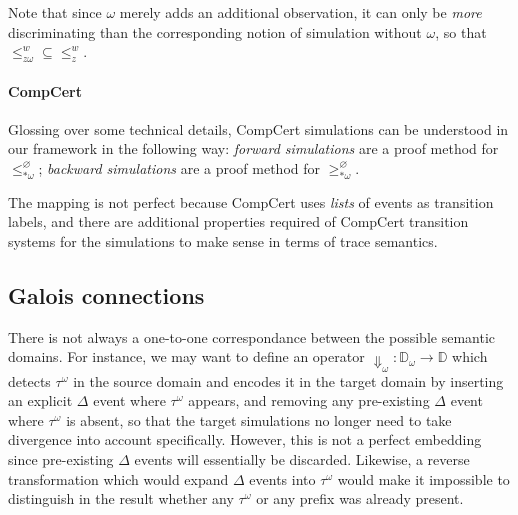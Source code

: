 \documentclass[11pt]{article}
\begin{document}
Note that since $\omega$ merely adds an additional observation,
it can only be \emph{more} discriminating than
the corresponding notion of simulation without $\omega$,
so that ${\le^w_{z \omega}} \subseteq {\le^w_z}$.


\paragraph{CompCert} %

Glossing over some technical details,
CompCert simulations can be understood in our framework
in the following way:
\emph{forward simulations}
are a proof method for $\le^\varnothing_{*\omega}$;
\emph{backward simulations}
are a proof method for $\ge^\varnothing_{*\omega}$.

The mapping is not perfect because
CompCert uses \emph{lists} of events as transition labels,
and there are additional properties
required of CompCert transition systems
for the simulations to make sense
in terms of trace semantics.



\subsection{Galois connections} %

There is not always a one-to-one correspondance between
the possible semantic domains.
For instance,
we may want to define an operator
$\Downarrow_\omega : \mathbb{D}_\omega \rightarrow {\mathbb{D}}$
which detects $\tau^\omega$ in the source domain
and encodes it in the target domain
by inserting an explicit $\Delta$ event where $\tau^\omega$ appears,
and removing any pre-existing $\Delta$ event where $\tau^\omega$ is absent,
so that the target simulations no longer need to take
divergence into account specifically.
However,
this is not a perfect embedding
since pre-existing $\Delta$ events
will essentially be discarded.
Likewise,
a reverse transformation which would expand $\Delta$ events into $\tau^\omega$
would make it impossible to distinguish in the result
whether any $\tau^\omega$ or any prefix was already present.
\end{document}
